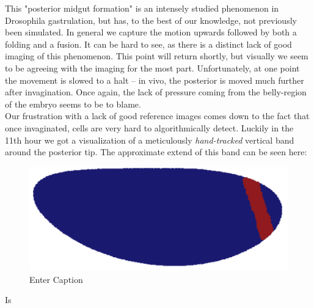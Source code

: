 This "posterior midgut formation" is an intensely studied phenomenon in Drosophila gastrulation, but has, to the best of our knowledge, not previously been simulated.  In general we capture the motion upwards followed by both a folding and a fusion. It can be hard to see, as there is a distinct lack of good imaging of this phenomenon. This point will return shortly, but visually we seem to be agreeing with the imaging for the most part. Unfortunately, at one point the movement is slowed to a halt -- in vivo, the posterior is moved much further after invagination. Once again, the lack of pressure coming from the belly-region of the embryo seems to be to blame. \\

Our frustration with a lack of good reference images comes down to the fact that once invaginated, cells are very hard to algorithmically detect. Luckily in the 11th hour we got a visualization of a meticulously \textit{hand-tracked} vertical band around the posterior tip. The approximate extend of this band can be seen here:

\begin{figure}[H]
    \centering
    \includegraphics[width=0.5\linewidth]{chapters//Results//figures/daniel_band_pos.png}
    \caption{Enter Caption}
    \label{fig:enter-label}
\end{figure}

Is

